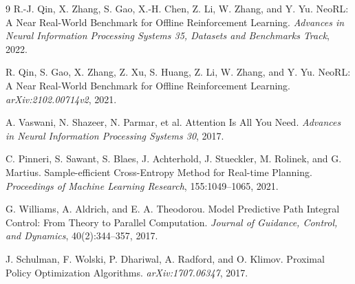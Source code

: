 \begingroup
\small
\begin{thebibliography}{9}
R.-J. Qin, X. Zhang, S. Gao, X.-H. Chen, Z. Li, W. Zhang, and Y. Yu.
NeoRL: A Near Real-World Benchmark for Offline Reinforcement Learning.
\emph{Advances in Neural Information Processing Systems 35, Datasets and Benchmarks Track}, 2022.

R. Qin, S. Gao, X. Zhang, Z. Xu, S. Huang, Z. Li, W. Zhang, and Y. Yu.
NeoRL: A Near Real-World Benchmark for Offline Reinforcement Learning.
\emph{arXiv:2102.00714v2}, 2021.

A. Vaswani, N. Shazeer, N. Parmar, et al.
Attention Is All You Need.
\emph{Advances in Neural Information Processing Systems 30}, 2017.

C. Pinneri, S. Sawant, S. Blaes, J. Achterhold, J. Stueckler, M. Rolinek, and G. Martius.
Sample-efficient Cross-Entropy Method for Real-time Planning.
\emph{Proceedings of Machine Learning Research}, 155:1049--1065, 2021.

G. Williams, A. Aldrich, and E. A. Theodorou.
Model Predictive Path Integral Control: From Theory to Parallel Computation.
\emph{Journal of Guidance, Control, and Dynamics}, 40(2):344--357, 2017.

J. Schulman, F. Wolski, P. Dhariwal, A. Radford, and O. Klimov.
Proximal Policy Optimization Algorithms.
\emph{arXiv:1707.06347}, 2017.
\end{thebibliography}
\endgroup
